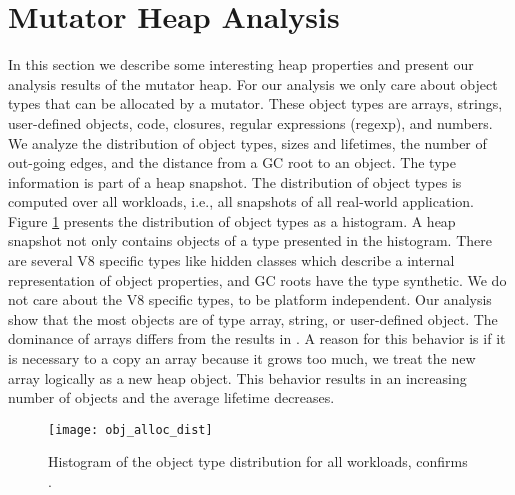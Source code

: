 
\section{Mutator Heap Analysis} \label{sec:analysis_mutator}

In this section we describe some interesting heap properties and present our analysis results of the mutator heap. For our analysis we only care about object types that can be allocated by a mutator. These object types are arrays, strings, user-defined objects, code, closures, regular expressions (regexp), and numbers. We analyze the distribution of object types, sizes and lifetimes, the number of out-going edges, and the distance from a GC root to an object. 
The type information is part of a heap snapshot. The distribution of object types is computed over all workloads, i.e., all snapshots of all real-world application. Figure \ref{fig:obj_alloc_dist} presents the distribution of object types as a histogram. A heap snapshot not only contains objects of a type presented in the histogram. There are several V8 specific types like hidden classes which describe a internal representation of object properties, and GC roots have the type synthetic. We do not care about the V8 specific types, to be platform independent. Our analysis show that the most objects are of type array, string, or user-defined object. The dominance of arrays differs from the results in \cite{JSMeter2009}. A reason for this behavior is if it is necessary to a copy an array because it grows too much, we treat the new array logically as a new heap object. This behavior results in an increasing number of objects and the average lifetime decreases. 
\begin{figure}
	\centering
	\texttt{[image: obj\_alloc\_dist]}
	\caption{Histogram of the object type distribution for all workloads, confirms \cite{JSMeter2009}.}
	\label{fig:obj_alloc_dist}
\end{figure}

